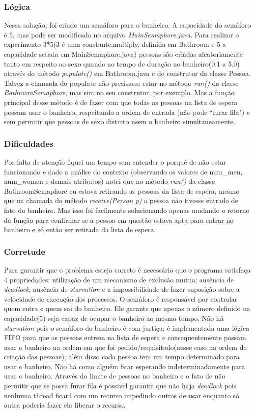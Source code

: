 \documentclass{article}
\newcommand\tab[1][1cm]{\hspace*{#1}}
\begin{document}
\subsubsection*{Lógica}
\tab Nessa solução, foi criado um semáforo para o banheiro. A capacidade do semáforo é 5, mas pode ser modificada no arquivo \textit{MainSemaphore.java}. Para realizar o experimento 3*5(3 é uma constante,multiply, definida em Bathroom e 5 a capacidade setada em MainSemaphore.java) pessoas são criadas aleatoriamente tanto em respeito ao sexo quando ao tempo de duração no banheiro(0.1 a 5.0) através do método \textit{populate()} em Bathroom.java e do construtor da classe Pessoa.\\
Talvez a chamada do populate não precisasse estar no método \textit{run()} da classe \textit{BathroomSemaphore}, mas sim no seu construtor, por exemplo. Mas a função principal desse método é de fazer com que todas as pessoas na lista de espera possam usar o banheiro, respeitando a ordem de entrada (não pode ``furar fila") e sem permitir que pessoas de sexo distinto usem o banheiro simultaneamente.

\subsubsection*{Dificuldades}
\tab Por falta de atenção fiquei um tempo sem entender o porquê de não estar funcionando e dado a análise do contexto (observando os valores de num\_men, num\_women e demais atributos) notei que no método \textit{run()} da classe BathroomSemaphore eu estava retirando as pessoas da lista de espera, mesmo que na chamada do método \textit{receive(Person p)} a pessoa não tivesse entrado de fato do banheiro. Mas isso foi facilmente solucionando apenas mudando o retorno da função para confirmar se a pessoa em questão estava apta para entrar no banheiro e só então ser retirada da lista de espera.
\subsubsection*{Corretude}
\tab Para garantir que o problema esteja correto é necessário que o programa satisfaça 4 propriedades: utilização de um mecanismo de exclusão mutua; ausência de \textit{deadlock}, ausência de \textit{starvation} e a impossibilidade de fazer suposição sobre a velocidade de execução dos processos.
\tab O semáforo é responsável por controlar quem entra e quem sai do banheiro. Ele garante que apenas o número definido na capacidade(5) seja capaz de ocupar o banheiro ao mesmo tempo.\hfill \break
\tab Não há \textit{starvation} pois o semáforo do banheiro é com justiça; é implementada uma lógica FIFO para que as pessoas entrem na lista de espera e consequentemente possam usar o banheiro na ordem em que foi pedido/requisitado(nesse caso na ordem de criação das pessoas); além disso cada pessoa tem um tempo determinado para usar o banheiro. Não há como alguém ficar esperando indeterminadamente para usar o banheiro.\hfill \break
\tab Através do limite de pessoas no banheiro e o fato de não permitir que se possa furar fila é possivel garantir que não haja \textit{deadlock} pois nenhuma thread ficará com um recurso impedindo outras de usar enquanto só outra poderia fazer ela liberar o recurso.
\end{document}
